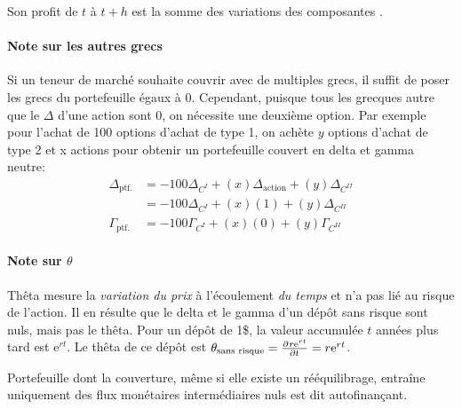 \documentclass[10pt, french]{article}
\begin{document}
\begin{multicols*}{2}
Son profit de $t$ à $t + h$ est la somme des variations des composantes .\\

\paragraph{Note sur les autres grecs}	Si un teneur de marché souhaite couvrir avec de multiples grecs, il suffit de poser les grecs du portefeuille égaux à 0. Cependant, puisque tous les grecques autre que le $\Delta$ d'une action sont 0, on nécessite une deuxième option. Par exemple pour l'achat de 100 options d'achat de type 1, on achète $y$ options d'achat de type 2 et x actions pour obtenir un portefeuille couvert en delta et gamma neutre:
\begin{align*}
	\Delta_{\text{ptf.}}
	&=	-100 \Delta_{C^{I}} + (x)\Delta_{\text{action}} + (y)\Delta_{C^{II}}	\\
	&=	-100 \Delta_{C^{I}} + (x)(1) + (y)\Delta_{C^{II}}	\\
	\Gamma_{\text{ptf.}}
	&=	-100 \Gamma_{C^{I}} + (x)(0) + (y)\Gamma_{C^{II}}	
\end{align*}

\paragraph{Note sur $\theta$} Thêta mesure la \textit{variation du prix} à l'écoulement \textit{du temps} et n'a pas lié au risque de l'action. Il en résulte que le delta et le gamma d'un dépôt sans risque sont nuls, mais pas le thêta. Pour un dépôt de 1\$, la valeur accumulée $t$ années plus tard est $\textrm{e}^{rt}$. Le thêta de ce dépôt est $\theta_{\text{sans risque}}	=	\deriv{t}{r\textrm{e}^{rt}}	=	r\textrm{e}^{rt}$. 

\begin{definitionNOHFILL}[Autofinançant]
Portefeuille dont la couverture, même si elle existe un rééquilibrage, entraîne uniquement des flux monétaires intermédiaires nuls est dit autofinançant.
\end{definitionNOHFILL}


\columnbreak

\end{multicols*}
\end{document}
